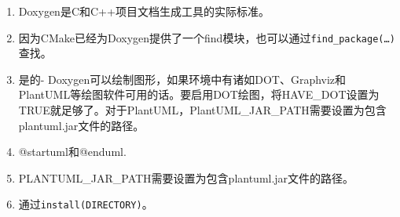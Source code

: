 

\begin{enumerate}
\item 
Doxygen是C和C++项目文档生成工具的实际标准。

\item
因为CMake已经为Doxygen提供了一个find模块，也可以通过\texttt{find\_package(…)}查找。

\item 
是的-  Doxygen可以绘制图形，如果环境中有诸如DOT、Graphviz和PlantUML等绘图软件可用的话。要启用DOT绘图，将HAVE\_DOT设置为TRUE就足够了。对于PlantUML，PlantUML\_JAR\_PATH需要设置为包含plantuml.jar文件的路径。

\item 
@startuml和@enduml.

\item 
PLANTUML\_JAR\_PATH需要设置为包含plantuml.jar文件的路径。

\item 
通过\texttt{install(DIRECTORY)}。
\end{enumerate}